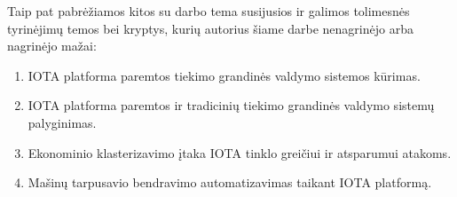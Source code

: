 Taip pat pabrėžiamos kitos su darbo tema susijusios ir galimos tolimesnės tyrinėjimų temos bei kryptys, kurių autorius šiame darbe nenagrinėjo arba nagrinėjo mažai:
\begin{enumerate}
    \item IOTA platforma paremtos tiekimo grandinės valdymo sistemos kūrimas.
    \item IOTA platforma paremtos ir tradicinių tiekimo grandinės valdymo sistemų palyginimas.
    \item Ekonominio klasterizavimo įtaka IOTA tinklo greičiui ir atsparumui atakoms.
    \item Mašinų tarpusavio bendravimo automatizavimas taikant IOTA platformą.
\end{enumerate} 